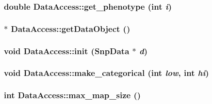 \hypertarget{classDataAccess_a52b91927560b4221d1095d7bb0dea4b1}{
\subsubsection[{get\_\-phenotype}]{\setlength{\rightskip}{0pt plus 5cm}double DataAccess::get\_\-phenotype (int {\em i})}}
\label{classDataAccess_a52b91927560b4221d1095d7bb0dea4b1}
\hypertarget{classDataAccess_adcb83e7fdf831ae7b22902ccec055daa}{
\subsubsection[{getDataObject}]{$\ast$ DataAccess::getDataObject ()}}
\label{classDataAccess_adcb83e7fdf831ae7b22902ccec055daa}
\hypertarget{classDataAccess_a2a55acc88408a8b40f49e4a5330e2113}{
\subsubsection[{init}]{\setlength{\rightskip}{0pt plus 5cm}void DataAccess::init ({\bf SnpData} $\ast$ {\em d})}}
\label{classDataAccess_a2a55acc88408a8b40f49e4a5330e2113}
\hypertarget{classDataAccess_a3f3a33a79e44ba86fa1516e965a7348c}{
\subsubsection[{make\_\-categorical}]{\setlength{\rightskip}{0pt plus 5cm}void DataAccess::make\_\-categorical (int {\em low}, \/  int {\em hi})}}
\label{classDataAccess_a3f3a33a79e44ba86fa1516e965a7348c}
\hypertarget{classDataAccess_a8a0848d14c6c294abdee288348a02b75}{
\subsubsection[{max\_\-map\_\-size}]{\setlength{\rightskip}{0pt plus 5cm}int DataAccess::max\_\-map\_\-size ()}}
